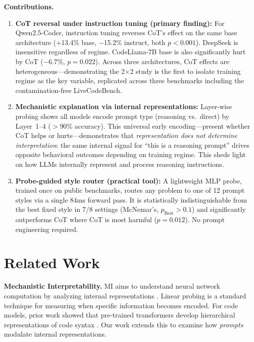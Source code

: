 \documentclass[11pt]{article}
\begin{document}
\textbf{Contributions.}
\begin{enumerate}
    \item \textbf{CoT reversal under instruction tuning (primary finding):} For Qwen2.5-Coder, instruction tuning reverses CoT's effect on the same base architecture (+13.4\% base, $-$15.2\% instruct, both $p{<}0.001$). DeepSeek is insensitive regardless of regime. CodeLlama-7B base is also significantly hurt by CoT ($-6.7\%$, $p{=}0.022$). Across three architectures, CoT effects are heterogeneous---demonstrating the 2$\times$2 study is the first to isolate training regime as the key variable, replicated across three benchmarks including the contamination-free LiveCodeBench.
    \item \textbf{Mechanistic explanation via internal representations:} Layer-wise probing shows all models encode prompt type (reasoning vs.\ direct) by Layer~1--4 ($>$90\% accuracy). This universal early encoding---present whether CoT helps or hurts---demonstrates that \emph{representation does not determine interpretation}: the same internal signal for ``this is a reasoning prompt'' drives opposite behavioral outcomes depending on training regime. This sheds light on how LLMs internally represent and process reasoning instructions.
    \item \textbf{Probe-guided style router (practical tool):} A lightweight MLP probe, trained once on public benchmarks, routes any problem to one of 12 prompt styles via a single 84ms forward pass. It is statistically indistinguishable from the best fixed style in 7/8 settings (McNemar's, $p_{\text{Best}}{>}0.1$) and significantly outperforms CoT where CoT is most harmful ($p{=}0.012$). No prompt engineering required.
\end{enumerate}

\section{Related Work}

\textbf{Mechanistic Interpretability.} MI aims to understand neural network computation by analyzing internal representations \citep{elhage2022toy, olah2020zoom}. Linear probing \citep{alain2016understanding} is a standard technique for measuring when specific information becomes encoded. For code models, prior work showed that pre-trained transformers develop hierarchical representations of code syntax \citep{wan2022they}. Our work extends this to examine how \emph{prompts} modulate internal representations.
\end{document}
